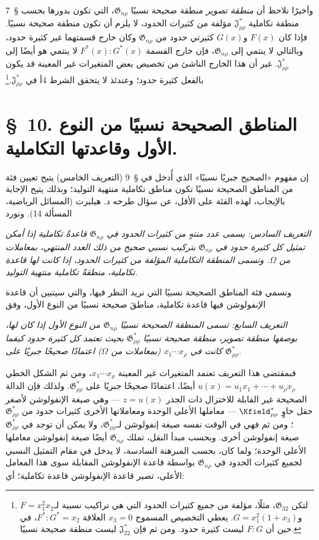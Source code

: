 \documentclass[11pt]{article}
\newcommand{\srcLTR}[1]{\relax\ifmmode\text{\mbox{\babelsublr{\foreignlanguage{english}{#1}}}}\else\babelsublr{\foreignlanguage{english}{#1}}\fi}
\newcommand{\srcfn}[2]{\begingroup\renewcommand{\thefootnote}{\srcLTR{#1}}\footnote{#2}\addtocounter{footnote}{-1}\endgroup}
\providecommand{\Jdom}{\mathfrak{J}}
\providecommand{\Gdom}{\mathfrak{G}}
\begin{document}
وأخيرًا نلاحظ أن \emph{منطقة تصوير} منطقة صحيحة نسبيًا $\Gdom_{n\rho}$، التي تكون بدورها بحسب \S\ 7 منطقة تكاملية $\Jdom^*_{\rho\rho}$ مؤلفة من كثيرات الحدود، لا يلزم أن تكون منطقة صحيحة نسبيًا. فإذا كان $F(x)$ و$G(x)$ كثيرتي حدود من $\Gdom_{n\rho}$ وكان خارج قسمتهما غير كثيرة حدود، وبالتالي لا ينتمي إلى $\Gdom_{n\rho}$، فإن خارج القسمة $F^*(x):G^*(x)$ لا ينتمي هو أيضًا إلى $\Jdom^*_{\rho\rho}$. غير أن هذا الخارج الناشئ من تخصيص بعض المتغيرات غير المعينة قد يكون بالفعل كثيرة حدود؛ وعندئذ لا يتحقق الشرط 4أ في $\Jdom^*_{\rho\rho}$.\srcfn{**)}{لتكن $\Gdom_{32}$، مثلًا، مؤلفة من جميع كثيرات الحدود التي هي تراكيب نسبية لـ$F=x_1^2x_2$ و$G=x_1^2(1+x_3)$. يعطي التخصيص المسموح $x_3=0$ العلاقة $F^*:G^*=x_2$، في حين أن $F:G$ ليست كثيرة حدود. ومن ثم فإن $\Jdom^*_{22}$ ليست منطقة صحيحة نسبيًا.}

\section*{\S\ 10. المناطق الصحيحة نسبيًا من النوع الأول وقاعدتها التكاملية.}

إن مفهوم «الصحيح جبريًا نسبيًا» الذي أُدخل في \S\ 9 (التعريف الخامس) يتيح تعيين فئة من المناطق الصحيحة نسبيًا تكون مناطق تكاملية منتهية التوليد؛ وبذلك يتيح الإجابة بالإيجاب، لهذه الفئة على الأقل، عن سؤال طرحه د. هيلبرت (المسائل الرياضية، المسألة 14). ونورد

\emph{التعريف السادس: يسمى عدد منتهٍ من كثيرات الحدود في $\Gdom_{n\rho}$ قاعدةً تكاملية إذا أمكن تمثيل كل كثيرة حدود في $\Gdom_{n\rho}$ بتركيب نسبي صحيح من ذلك العدد المنتهي، بمعاملات من $\Omega$. وتسمى المنطقة التكاملية المؤلفة من كثيرات الحدود، إذا كانت لها قاعدة تكاملية، منطقةً تكاملية منتهية التوليد.}

ونسمي فئة المناطق الصحيحة نسبيًا التي نريد النظر فيها، والتي سيتبين أن قاعدة الإنفولوشن فيها قاعدة تكاملية، مناطقَ صحيحة نسبيًا من النوع الأول، وفق

\emph{التعريف السابع: تسمى المنطقة الصحيحة نسبيًا $\Gdom_{n\rho}$ من النوع الأول إذا كان لها، بوصفها منطقة تصوير، منطقة صحيحة نسبيًا $\Gdom^*_{\rho\rho}$ بحيث تعتمد كل كثيرة حدود كيفما كانت في $x_1\cdots x_\rho$ (بمعاملات من $\Omega$) اعتمادًا صحيحًا جبريًا على $\Gdom^*_{\rho\rho}$.}

فبمقتضى هذا التعريف تعتمد المتغيرات غير المعينة $x_1\cdots x_\rho$، ومن ثم الشكل الخطي $u(x)=u_1x_1+\cdots+u_\rho x_\rho$ أيضًا، اعتمادًا صحيحًا جبريًا على $\Gdom^*_{\rho\rho}$. ولذلك فإن الدالة الصحيحة غير القابلة للاختزال ذات الجذر $z=u(x)$ --- وهي صيغة الإنفولوشن لأصغر حقل حاوٍ $\Kfield^*_{\rho\rho}$ --- معاملها الأعلى الوحدة ومعاملاتها الأخرى كثيرات حدود من $\Gdom^*_{\rho\rho}$؛ ومن ثم فهي في الوقت نفسه صيغة إنفولوشن لـ$\Gdom^*_{\rho\rho}$، ولا يمكن أن توجد في $\Gdom^*_{\rho\rho}$ صيغة إنفولوشن أخرى. وبحسب مبدأ النقل، تملك $\Gdom_{n\rho}$ أيضًا صيغة إنفولوشن معاملها الأعلى الوحدة؛ ولما كان، بحسب المبرهنة السادسة، لا يدخل في مقام التمثيل النسبي لجميع كثيرات الحدود في $\Gdom_{n\rho}$ بواسطة قاعدة الإنفولوشن المقابلة سوى هذا المعامل الأعلى، تصير قاعدة الإنفولوشن قاعدة تكاملية؛ أي:
\end{document}
